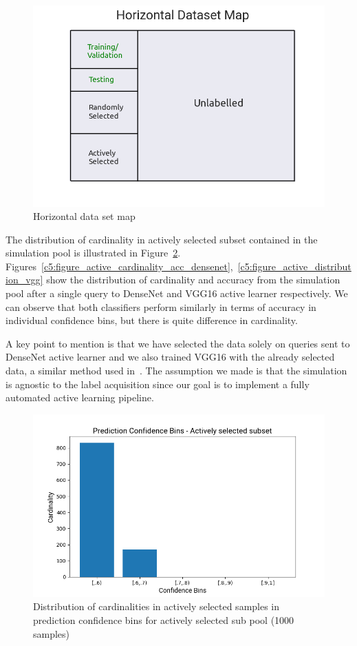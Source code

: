 \begin{figure}[ht!]
    \centering  
    \includegraphics[width=.55\textwidth]{figures/chap5/dof/horizontal_dataset_map}
    \caption{Horizontal data set map}
    \label{c5:dataset_map}
\end{figure}

The distribution of cardinality in actively selected subset contained in the simulation pool is illustrated in Figure~\ref{c5:figure_active_distribution_densenet}.
Figures~\ref{c5:figure_active_cardinality_acc_densenet},~\ref{c5:figure_active_distribution_vgg} show the distribution of cardinality and accuracy from the simulation pool after a single query to DenseNet and VGG16 active learner respectively. 
We can observe that both classifiers perform similarly in terms of accuracy in individual confidence bins, but there is quite difference in cardinality.

A key point to mention is that we have selected the data solely on queries sent to DenseNet active learner and we also trained VGG16 with the already selected data, a similar method used in~\cite{bosser2020model}.
The assumption we made is that the simulation is agnostic to the label acquisition since our goal is to implement a fully automated active learning pipeline.

\begin{figure}[ht!]
    \centering  
    \includegraphics[width=.55\textwidth]{figures/chap5/simulation/pools/pred_conf_active_1000_dataset}
    \caption{Distribution of cardinalities in actively selected samples in prediction confidence bins for  actively selected sub pool (1000 samples)}
    \label{c5:figure_active_distribution_densenet}
\end{figure}

